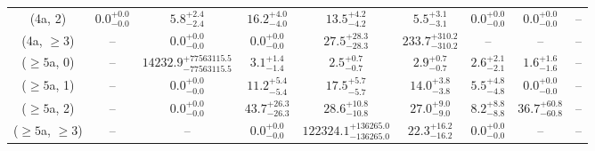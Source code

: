 \begin{table}[h!]
{\begin{tabular}{ccccccccc}
	(4a, 2) & $0.0^{+ 0.0 }_{- 0.0 }$ & $5.8^{+ 2.4 }_{- 2.4 }$ & $16.2^{+ 4.0 }_{- 4.0 }$ & $13.5^{+ 4.2 }_{- 4.2 }$ & $5.5^{+ 3.1 }_{- 3.1 }$ & $0.0^{+ 0.0 }_{- 0.0 }$ & $0.0^{+ 0.0 }_{- 0.0 }$ & -- \\[0.5ex] 
	(4a, $\ge3$) & -- & $0.0^{+ 0.0 }_{- 0.0 }$ & $0.0^{+ 0.0 }_{- 0.0 }$ & $27.5^{+ 28.3 }_{- 28.3 }$ & $233.7^{+ 310.2 }_{- 310.2 }$ & -- & -- & -- \\[0.5ex] 
	($\ge5$a, 0) & -- & $14232.9^{+ 77563115.5 }_{- 77563115.5 }$ & $3.1^{+ 1.4 }_{- 1.4 }$ & $2.5^{+ 0.7 }_{- 0.7 }$ & $2.9^{+ 0.7 }_{- 0.7 }$ & $2.6^{+ 2.1 }_{- 2.1 }$ & $1.6^{+ 1.6 }_{- 1.6 }$ & -- \\[0.5ex] 
	($\ge5$a, 1) & -- & $0.0^{+ 0.0 }_{- 0.0 }$ & $11.2^{+ 5.4 }_{- 5.4 }$ & $17.5^{+ 5.7 }_{- 5.7 }$ & $14.0^{+ 3.8 }_{- 3.8 }$ & $5.5^{+ 4.8 }_{- 4.8 }$ & $0.0^{+ 0.0 }_{- 0.0 }$ & -- \\[0.5ex] 
	($\ge5$a, 2) & -- & $0.0^{+ 0.0 }_{- 0.0 }$ & $43.7^{+ 26.3 }_{- 26.3 }$ & $28.6^{+ 10.8 }_{- 10.8 }$ & $27.0^{+ 9.0 }_{- 9.0 }$ & $8.2^{+ 8.8 }_{- 8.8 }$ & $36.7^{+ 60.8 }_{- 60.8 }$ & -- \\[0.5ex] 
	($\ge5$a, $\ge3$) & -- & -- & $0.0^{+ 0.0 }_{- 0.0 }$ & $122324.1^{+ 136265.0 }_{- 136265.0 }$ & $22.3^{+ 16.2 }_{- 16.2 }$ & $0.0^{+ 0.0 }_{- 0.0 }$ & -- & -- \\[0.5ex] 
	\hline
	\hline
\end{tabular}}
\end{table}
